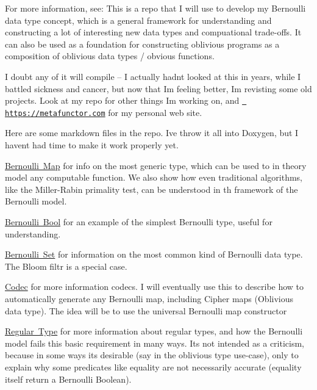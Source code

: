 For more information, see\+: This is a repo that I will use to develop my Bernoulli data type concept, which is a general framework for understanding and constructing a lot of interesting new data types and compuational trade-\/offs. It can also be used as a foundation for constructing oblivious programs as a composition of oblivious data types / obvious functions.

I doubt any of it will compile -- I actually hadn\textquotesingle{}t looked at this in years, while I battled sickness and cancer, but now that I\textquotesingle{}m feeling better, I\textquotesingle{}m revisting some old projects. Look at my repo for other things I\textquotesingle{}m working on, and \href{https://metafunctor.com}{\texttt{ https\+://metafunctor.\+com}} for my personal web site.

Here are some markdown files in the repo. I\textquotesingle{}ve throw it all into Doxygen, but I haven\textquotesingle{}t had time to make it work properly yet.


\begin{DoxyItemize}
\item \mbox{\hyperlink{md_BERNOULLI_MAP}{Bernoulli Map}} for info on the most generic type, which can be used to in theory model any computable function. We also show how even traditional algorithms, like the Miller-\/\+Rabin primality test, can be understood in th framework of the Bernoulli model.
\item \mbox{\hyperlink{md_BERNOULLI_BOOL}{Bernoulli Bool}} for an example of the simplest Bernoulli type, useful for understanding.
\item \mbox{\hyperlink{md_BERNOULLI_SET}{Bernoulli Set}} for information on the most common kind of Bernoulli data type. The Bloom filtr is a special case.
\item \mbox{\hyperlink{codec_md_CODEC}{Codec}} for more information codecs. I will eventually use this to describe how to automatically generate any Bernoulli map, including Cipher maps (Oblivious data type). The idea will be to use the universal Bernoulli map constructor
\item \mbox{\hyperlink{regular_type_md_REGULAR_TYPE_CONCEPT}{Regular Type}} for more information about regular types, and how the Bernoulli model fails this basic requirement in many ways. It\textquotesingle{}s not intended as a criticism, because in some ways it\textquotesingle{}s desirable (say in the oblivious type use-\/case), only to explain why some predicates like equality are not necessarily accurate (equality itself return a Bernoulli Boolean). 
\end{DoxyItemize}